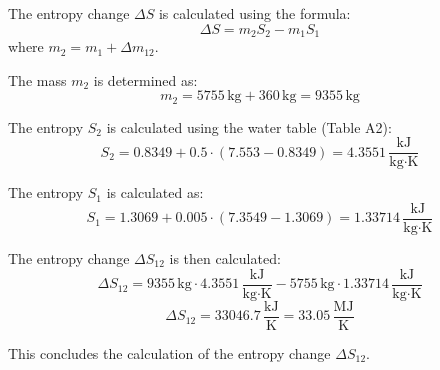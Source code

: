 The entropy change \( \Delta S \) is calculated using the formula:  
\[
\Delta S = m_2 S_2 - m_1 S_1
\]  
where \( m_2 = m_1 + \Delta m_{12} \).  

The mass \( m_2 \) is determined as:  
\[
m_2 = 5755 \, \text{kg} + 360 \, \text{kg} = 9355 \, \text{kg}
\]  

The entropy \( S_2 \) is calculated using the water table (Table A2):  
\[
S_2 = 0.8349 + 0.5 \cdot (7.553 - 0.8349) = 4.3551 \, \frac{\text{kJ}}{\text{kg·K}}
\]  

The entropy \( S_1 \) is calculated as:  
\[
S_1 = 1.3069 + 0.005 \cdot (7.3549 - 1.3069) = 1.33714 \, \frac{\text{kJ}}{\text{kg·K}}
\]  

The entropy change \( \Delta S_{12} \) is then calculated:  
\[
\Delta S_{12} = 9355 \, \text{kg} \cdot 4.3551 \, \frac{\text{kJ}}{\text{kg·K}} - 5755 \, \text{kg} \cdot 1.33714 \, \frac{\text{kJ}}{\text{kg·K}}
\]  
\[
\Delta S_{12} = 33046.7 \, \frac{\text{kJ}}{\text{K}} = 33.05 \, \frac{\text{MJ}}{\text{K}}
\]  

This concludes the calculation of the entropy change \( \Delta S_{12} \).